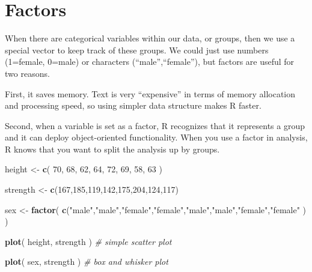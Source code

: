 \documentclass[]{book}
\newenvironment{Shaded}{\begin{snugshade}}{\end{snugshade}}
\newcommand{\CommentTok}[1]{\textcolor[rgb]{0.56,0.35,0.01}{\textit{#1}}}
\newcommand{\DecValTok}[1]{\textcolor[rgb]{0.00,0.00,0.81}{#1}}
\newcommand{\KeywordTok}[1]{\textcolor[rgb]{0.13,0.29,0.53}{\textbf{#1}}}
\newcommand{\NormalTok}[1]{#1}
\newcommand{\StringTok}[1]{\textcolor[rgb]{0.31,0.60,0.02}{#1}}
\theoremstyle{definition}
\theoremstyle{definition}
\theoremstyle{definition}
\theoremstyle{remark}
\begin{document}
\hypertarget{factors}{%
\section{Factors}\label{factors}}

When there are categorical variables within our data, or groups, then we
use a special vector to keep track of these groups. We could just use
numbers (1=female, 0=male) or characters (``male'',``female''), but
factors are useful for two reasons.

First, it saves memory. Text is very ``expensive'' in terms of memory
allocation and processing speed, so using simpler data structure makes R
faster.

Second, when a variable is set as a factor, R recognizes that it
represents a group and it can deploy object-oriented functionality. When
you use a factor in analysis, R knows that you want to split the
analysis up by groups.

\begin{Shaded}
\begin{Highlighting}[]
\NormalTok{height <-}\StringTok{ }\KeywordTok{c}\NormalTok{( }\DecValTok{70}\NormalTok{, }\DecValTok{68}\NormalTok{, }\DecValTok{62}\NormalTok{, }\DecValTok{64}\NormalTok{, }\DecValTok{72}\NormalTok{, }\DecValTok{69}\NormalTok{, }\DecValTok{58}\NormalTok{, }\DecValTok{63}\NormalTok{  )}

\NormalTok{strength <-}\StringTok{ }\KeywordTok{c}\NormalTok{(}\DecValTok{167}\NormalTok{,}\DecValTok{185}\NormalTok{,}\DecValTok{119}\NormalTok{,}\DecValTok{142}\NormalTok{,}\DecValTok{175}\NormalTok{,}\DecValTok{204}\NormalTok{,}\DecValTok{124}\NormalTok{,}\DecValTok{117}\NormalTok{)}

\NormalTok{sex <-}\StringTok{ }\KeywordTok{factor}\NormalTok{( }\KeywordTok{c}\NormalTok{(}\StringTok{"male"}\NormalTok{,}\StringTok{"male"}\NormalTok{,}\StringTok{"female"}\NormalTok{,}\StringTok{"female"}\NormalTok{,}\StringTok{"male"}\NormalTok{,}\StringTok{"male"}\NormalTok{,}\StringTok{"female"}\NormalTok{,}\StringTok{"female"}\NormalTok{ ) )}

\KeywordTok{plot}\NormalTok{( height, strength )   }\CommentTok{# simple scatter plot}

\KeywordTok{plot}\NormalTok{( sex, strength )      }\CommentTok{# box and whisker plot       }
\end{Highlighting}
\end{Shaded}
\end{document}
